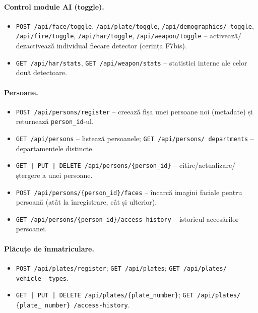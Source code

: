 \documentclass[../../main.tex]{subfiles}
\begin{document}
\paragraph*{Control module AI (toggle).}
\begin{itemize}
    \item \texttt{POST /api/face/toggle}, \texttt{/api/plate/toggle}, \texttt{/api/demographics/ \linebreak toggle}, \texttt{/api/fire/toggle}, \texttt{/api/har/toggle}, \texttt{/api/weapon/toggle} -- activează/ dezactivează individual fiecare detector (cerința F7bis).
    \item \texttt{GET /api/har/stats}, \texttt{GET /api/weapon/stats} -- statistici interne ale celor două detectoare.
\end{itemize}

\paragraph*{Persoane.}
\begin{itemize}
    \item \texttt{POST /api/persons/register} -- creează fișa unei persoane noi (metadate) și returnează \texttt{person\_id}-ul.
    \item \texttt{GET /api/persons} -- listează persoanele; \texttt{GET /api/persons/ \linebreak departments} -- departamentele distincte.
    \item \texttt{GET\,|\,PUT\,|\,DELETE /api/persons/\{person\_id\}} -- citire/actualizare/ \linebreak ștergere a unei persoane.
    \item \texttt{POST /api/persons/\{person\_id\}/faces} -- încarcă imagini faciale pentru persoană (atât la înregistrare, cât și ulterior).
    \item \texttt{GET /api/persons/\{person\_id\}/access-history} -- istoricul accesărilor persoanei.
\end{itemize}

\paragraph*{Plăcuțe de înmatriculare.}
\begin{itemize}
    \item \texttt{POST /api/plates/register}; \texttt{GET /api/plates}; \texttt{GET /api/plates/ \linebreak vehicle- types}.
    \item \texttt{GET\,|\,PUT\,|\,DELETE /api/plates/\{plate\_number\}}; \texttt{GET /api/plates/ \linebreak \{plate\_ number\} /access-history}.
\end{itemize}
\end{document}
